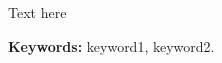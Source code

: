 
\setlength{\parindent}{0pt}
\setlength{\parskip}{1em}
\setlength{\baselineskip}{1.6em}

\begin{center}
  \fontsize{14}{17}
\end{center}
\vspace{2em}

Text here


\textbf{Keywords:} keyword1, keyword2. 